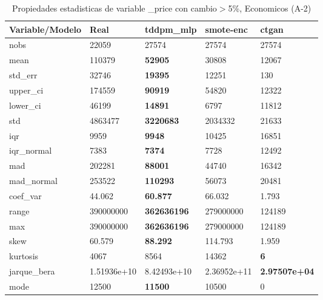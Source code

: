 \begin{table}[H]
\centering
\fontsize{8}{14}\selectfont
\caption{Propiedades estadisticas de variable \_price con cambio\ensuremath{>}5\%, Economicos (A-2)}
\label{table-stats-economicos-a-2-_price-short}
\begin{tabular}{|l|m{10em}|m{10em}|m{10em}|m{10em}|}
\hline
 \rowcolor[gray]{0.8}
Variable/Modelo & Real & tddpm\_mlp & smote-enc & ctgan \\
\hline nobs & 22059 & 27574 & 27574 & 27574 \\
\hline mean & 110379 & \bfseries 52905 & 30808 & \cellcolor[rgb]{0.9, 0.54, 0.52} 12067 \\
\hline std\_err & 32746 & \bfseries 19395 & 12251 & \cellcolor[rgb]{0.9, 0.54, 0.52} 130 \\
\hline upper\_ci & 174559 & \bfseries 90919 & 54820 & \cellcolor[rgb]{0.9, 0.54, 0.52} 12322 \\
\hline lower\_ci & 46199 & \bfseries 14891 & \cellcolor[rgb]{0.9, 0.54, 0.52} 6797 & 11812 \\
\hline std & 4863477 & \bfseries 3220683 & 2034332 & \cellcolor[rgb]{0.9, 0.54, 0.52} 21633 \\
\hline iqr & 9959 & \bfseries 9948 & 10425 & \cellcolor[rgb]{0.9, 0.54, 0.52} 16851 \\
\hline iqr\_normal & 7383 & \bfseries 7374 & 7728 & \cellcolor[rgb]{0.9, 0.54, 0.52} 12492 \\
\hline mad & 202281 & \bfseries 88001 & 44740 & \cellcolor[rgb]{0.9, 0.54, 0.52} 16342 \\
\hline mad\_normal & 253522 & \bfseries 110293 & 56073 & \cellcolor[rgb]{0.9, 0.54, 0.52} 20481 \\
\hline coef\_var & 44.062 & \bfseries 60.877 & 66.032 & \cellcolor[rgb]{0.9, 0.54, 0.52} 1.793 \\
\hline range & 390000000 & \bfseries 362636196 & 279000000 & \cellcolor[rgb]{0.9, 0.54, 0.52} 124189 \\
\hline max & 390000000 & \bfseries 362636196 & 279000000 & \cellcolor[rgb]{0.9, 0.54, 0.52} 124189 \\
\hline skew & 60.579 & \bfseries 88.292 & 114.793 & \cellcolor[rgb]{0.9, 0.54, 0.52} 1.959 \\
\hline kurtosis & 4067 & 8564 & \cellcolor[rgb]{0.9, 0.54, 0.52} 14362 & \bfseries 6 \\
\hline jarque\_bera & 1.51936e+10 & 8.42493e+10 & \cellcolor[rgb]{0.9, 0.54, 0.52} 2.36952e+11 & \bfseries 2.97507e+04 \\
\hline mode & 12500 & \bfseries 11500 & 10500 & \cellcolor[rgb]{0.9, 0.54, 0.52} 0 \\

\end{tabular}
\end{table}
